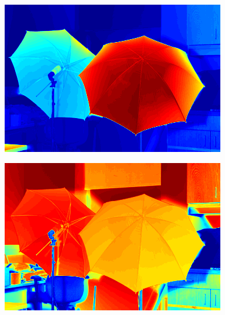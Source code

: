\documentclass[a0,landscape]{a0poster}
\begin{document}
\begin{multicols}{4}
{ \centering
  \begin{minipage}{0.45\columnwidth}
    \centering
    \includegraphics[width=\textwidth]{./Images/Umbrella/evec01.png}%
  \end{minipage}\hfill %
  \begin{minipage}{0.45\columnwidth}
    \centering
    \includegraphics[width=\textwidth]{./Images/Umbrella/evec02.png}
  \end{minipage}
  \label{fig:Umbrellafig1}
}


\end{multicols}
\end{document}
